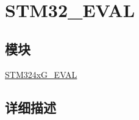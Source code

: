 \hypertarget{group___s_t_m32___e_v_a_l}{}\section{S\+T\+M32\+\_\+\+E\+V\+AL}
\label{group___s_t_m32___e_v_a_l}
\subsection*{模块}
\begin{DoxyCompactItemize}
\item 
\hyperlink{group___s_t_m324x_g___e_v_a_l}{S\+T\+M324x\+G\+\_\+\+E\+V\+AL}
\end{DoxyCompactItemize}


\subsection{详细描述}

